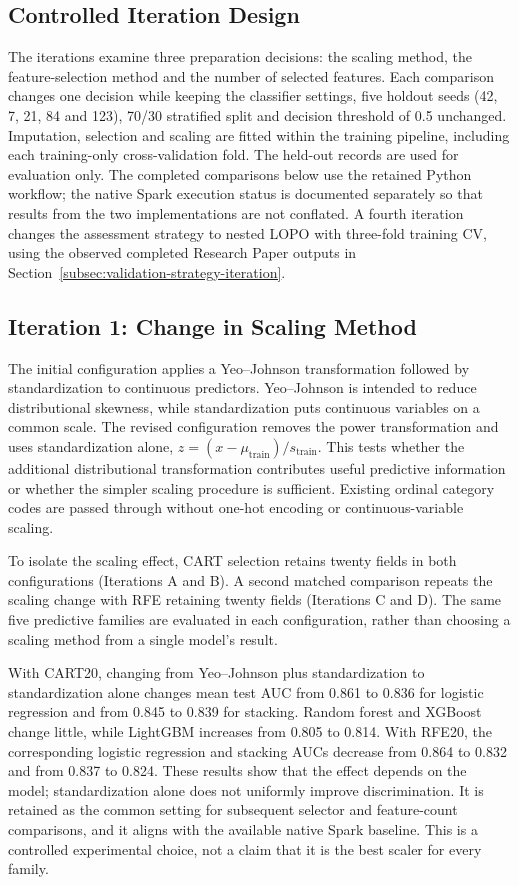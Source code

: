 \subsection{Controlled Iteration Design}
The iterations examine three preparation decisions: the scaling method, the feature-selection method and the number of selected features. Each comparison changes one decision while keeping the classifier settings, five holdout seeds (42, 7, 21, 84 and 123), 70/30 stratified split and decision threshold of 0.5 unchanged. Imputation, selection and scaling are fitted within the training pipeline, including each training-only cross-validation fold. The held-out records are used for evaluation only. The completed comparisons below use the retained Python workflow; the native Spark execution status is documented separately so that results from the two implementations are not conflated. A fourth iteration changes the assessment strategy to nested LOPO with three-fold training CV, using the observed completed Research Paper outputs in Section~\ref{subsec:validation-strategy-iteration}.

\subsection{Iteration 1: Change in Scaling Method}
The initial configuration applies a Yeo--Johnson transformation followed by standardization to continuous predictors. Yeo--Johnson is intended to reduce distributional skewness, while standardization puts continuous variables on a common scale. The revised configuration removes the power transformation and uses standardization alone, $z=(x-\mu_{\mathrm{train}})/s_{\mathrm{train}}$. This tests whether the additional distributional transformation contributes useful predictive information or whether the simpler scaling procedure is sufficient. Existing ordinal category codes are passed through without one-hot encoding or continuous-variable scaling.

To isolate the scaling effect, CART selection retains twenty fields in both configurations (Iterations A and B). A second matched comparison repeats the scaling change with RFE retaining twenty fields (Iterations C and D). The same five predictive families are evaluated in each configuration, rather than choosing a scaling method from a single model's result.



With CART20, changing from Yeo--Johnson plus standardization to standardization alone changes mean test AUC from 0.861 to 0.836 for logistic regression and from 0.845 to 0.839 for stacking. Random forest and XGBoost change little, while LightGBM increases from 0.805 to 0.814. With RFE20, the corresponding logistic regression and stacking AUCs decrease from 0.864 to 0.832 and from 0.837 to 0.824. These results show that the effect depends on the model; standardization alone does not uniformly improve discrimination. It is retained as the common setting for subsequent selector and feature-count comparisons, and it aligns with the available native Spark baseline. This is a controlled experimental choice, not a claim that it is the best scaler for every family.

